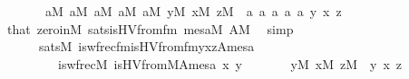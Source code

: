 \begin{isabellebody}
\ \ \ \ \ \ \ {\isachardoublequoteopen}a{}{\isasymin}M{\isachardoublequoteclose}\ {\isachardoublequoteopen}a{}{\isasymin}M{\isachardoublequoteclose}\ {\isachardoublequoteopen}a{}{\isasymin}M{\isachardoublequoteclose}\ {\isachardoublequoteopen}a{}{\isasymin}M{\isachardoublequoteclose}\ {\isachardoublequoteopen}a{}{\isasymin}M{\isachardoublequoteclose}\ {\isachardoublequoteopen}y{\isasymin}M{\isachardoublequoteclose}\ {\isachardoublequoteopen}x{\isasymin}M{\isachardoublequoteclose}\ {\isachardoublequoteopen}z{\isasymin}M{\isachardoublequoteclose}\ \ a{}\ a{}\ a{}\ a{}\ a{}\ y\ x\ z\isanewline
\ \ \ \ \ \ \isamarkupfalse%
\ that\ zero{\isacharunderscore}{\kern0pt}in{\isacharunderscore}{\kern0pt}M\ sats{\isacharunderscore}{\kern0pt}is{\isacharunderscore}{\kern0pt}HVfrom{\isacharunderscore}{\kern0pt}fm\ {\isacartoucheopen}mesa{\isasymin}M{\isacartoucheclose}\ {\isacartoucheopen}A{\isasymin}M{\isacartoucheclose}\ \isamarkupfalse%
\ simp\isanewline
\ \ \ \ \isamarkupfalse%
\isanewline
\ \ \ \ \ \ {}{\isacharcolon}{\kern0pt}{\isachardoublequoteopen}sats{\isacharparenleft}{\kern0pt}M{\isacharcomma}{\kern0pt}\ is{\isacharunderscore}{\kern0pt}wfrec{\isacharunderscore}{\kern0pt}fm{\isacharparenleft}{\kern0pt}is{\isacharunderscore}{\kern0pt}HVfrom{\isacharunderscore}{\kern0pt}fm{\isacharparenleft}{\kern0pt}{}{\isacharcomma}{\kern0pt}{}{\isacharcomma}{\kern0pt}{}{\isacharcomma}{\kern0pt}{}{\isacharparenright}{\kern0pt}{\isacharcomma}{\kern0pt}{}{\isacharcomma}{\kern0pt}{}{\isacharcomma}{\kern0pt}{}{\isacharparenright}{\kern0pt}{\isacharcomma}{\kern0pt}{\isacharbrackleft}{\kern0pt}y{\isacharcomma}{\kern0pt}x{\isacharcomma}{\kern0pt}z{\isacharcomma}{\kern0pt}A{\isacharcomma}{\kern0pt}mesa{\isacharbrackright}{\kern0pt}{\isacharparenright}{\kern0pt}\isanewline
\ \ \ \ \ \ \ \ {\isasymlongleftrightarrow}\ is{\isacharunderscore}{\kern0pt}wfrec{\isacharparenleft}{\kern0pt}{\isacharhash}{\kern0pt}{\isacharhash}{\kern0pt}M{\isacharcomma}{\kern0pt}\ is{\isacharunderscore}{\kern0pt}HVfrom{\isacharparenleft}{\kern0pt}{\isacharhash}{\kern0pt}{\isacharhash}{\kern0pt}M{\isacharcomma}{\kern0pt}A{\isacharparenright}{\kern0pt}{\isacharcomma}{\kern0pt}mesa{\isacharcomma}{\kern0pt}\ x{\isacharcomma}{\kern0pt}\ y{\isacharparenright}{\kern0pt}{\isachardoublequoteclose}\isanewline
\ \ \ \ \ \ \ {\isachardoublequoteopen}y{\isasymin}M{\isachardoublequoteclose}\ {\isachardoublequoteopen}x{\isasymin}M{\isachardoublequoteclose}\ {\isachardoublequoteopen}z{\isasymin}M{\isachardoublequoteclose}\ \ y\ x\ z\isanewline

\end{isabellebody}
